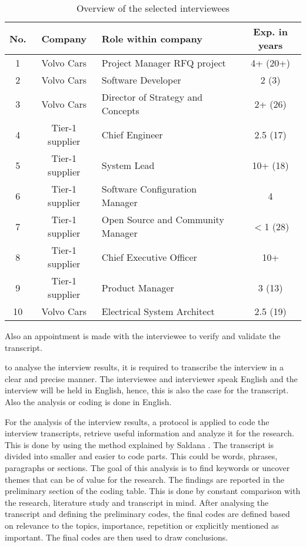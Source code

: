  \begin{table}[htb]
 \centering
 \begin{tabular}{|c|c|p{3.4cm}|c|}\hline
 {\bf No.} & {\bf Company} & {\bf Role within company} & {\bf Exp. in years}\\ \hline
 1 & Volvo Cars & Project Manager RFQ project & 4+ (20+) \\ \hline
 2 & Volvo Cars & Software Developer & 2 (3)\\ \hline
 3 & Volvo Cars & Director of Strategy and Concepts & 2+ (26) \\ \hline
 4 & Tier-1 supplier & Chief Engineer & 2.5 (17)\\ \hline
 5 & Tier-1 supplier & System Lead & 10+ (18) \\ \hline
 6 & Tier-1 supplier & Software Configuration Manager & 4\\ \hline
 7 & Tier-1 supplier & Open Source and Community Manager & $<$1 (28)\\ \hline
 8 & Tier-1 supplier & Chief Executive Officer & 10+\\ \hline
 9 & Tier-1 supplier & Product Manager & 3 (13)\\ \hline
 10 & Volvo Cars & Electrical System Architect & 2.5 (19)\\ \hline
 \end{tabular}
 \caption{Overview of the selected interviewees}
 \label{tab:population}
 \vspace{-.4cm}
 \end{table}

Also an appointment is made with the interviewee to verify and validate the transcript.

 to analyse the interview results, it is required to transcribe the interview in a clear and precise manner. The interviewee and interviewer speak English and the interview will be held in English, hence, this is also the case for the transcript. Also the analysis or coding is done in English.

 For the analysis of the interview results, a protocol is applied to code the interview transcripts, retrieve useful information and analyze it for the research. This is done by using the method explained by Saldana \cite{saldana2015coding}. The transcript is divided into smaller and easier to code parts. This could be words, phrases, paragraphs or sections. The goal of this analysis is to find keywords or uncover themes that can be of value for the research. The findings are reported in the preliminary section of the coding table. This is done by constant comparison with the research, literature study and transcript in mind. After analysing the transcript and defining the preliminary codes, the final codes are defined based on relevance to the topics, importance, repetition or explicitly mentioned as important. The final codes are then used to draw conclusions.

